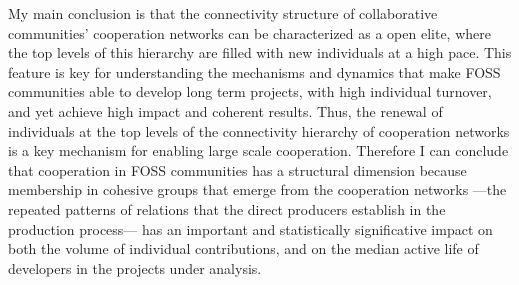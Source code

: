My main conclusion is that the connectivity structure of collaborative communities' cooperation networks can be characterized as a open elite, where the top levels of this hierarchy are filled with new individuals at a high pace. This feature is key for understanding the mechanisms and dynamics that make FOSS communities able to develop long term projects, with high individual turnover, and yet achieve high impact and coherent results. Thus, the renewal of individuals at the top levels of the connectivity hierarchy of cooperation networks is a key mechanism for enabling large scale cooperation. Therefore I can conclude that cooperation in FOSS communities has a structural dimension because membership in cohesive groups that emerge from the cooperation networks ---the repeated patterns of relations that the direct producers establish in the production process--- has an important and statistically significative impact on both the volume of individual contributions, and on the median active life of developers in the projects under analysis.
